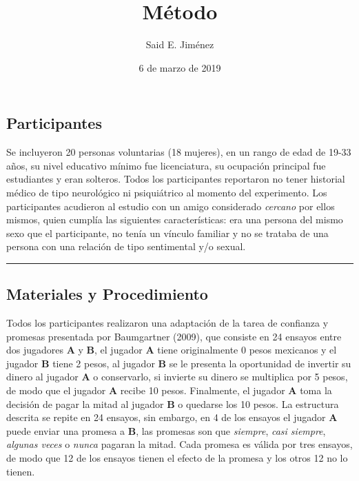 \documentclass[]{article}
\title{Método}
\author{Said E. Jiménez}
\date{6 de marzo de 2019}
\begin{document}
\maketitle

\subsection{Participantes}\label{participantes}

Se incluyeron 20 personas voluntarias (18 mujeres), en un rango de edad
de 19-33 años, su nivel educativo mínimo fue licenciatura, su ocupación
principal fue estudiantes y eran solteros. Todos los participantes
reportaron no tener historial médico de tipo neurológico ni psiquiátrico
al momento del experimento. Los participantes acudieron al estudio con
un amigo considerado \emph{cercano} por ellos mismos, quien cumplía las
siguientes características: era una persona del mismo sexo que el
participante, no tenía un vínculo familiar y no se trataba de una
persona con una relación de tipo sentimental y/o sexual.

\begin{center}\rule{0.5\linewidth}{\linethickness}\end{center}

\subsection{Materiales y
Procedimiento}\label{materiales-y-procedimiento}

Todos los participantes realizaron una adaptación de la tarea de
confianza y promesas presentada por Baumgartner (2009), que consiste en
24 ensayos entre dos jugadores \textbf{A} y \textbf{B}, el jugador
\textbf{A} tiene originalmente 0 pesos mexicanos y el jugador \textbf{B}
tiene 2 pesos, al jugador \textbf{B} se le presenta la oportunidad de
invertir su dinero al jugador \textbf{A} o conservarlo, si invierte su
dinero se multiplica por 5 pesos, de modo que el jugador \textbf{A}
recibe 10 pesos. Finalmente, el jugador \textbf{A} toma la decisión de
pagar la mitad al jugador \textbf{B} o quedarse los 10 pesos. La
estructura descrita se repite en 24 ensayos, sin embargo, en 4 de los
ensayos el jugador \textbf{A} puede enviar una promesa a \textbf{B}, las
promesas son que \emph{siempre}, \emph{casi siempre}, \emph{algunas
veces} o \emph{nunca} pagaran la mitad. Cada promesa es válida por tres
ensayos, de modo que 12 de los ensayos tienen el efecto de la promesa y
los otros 12 no lo tienen.
\end{document}
